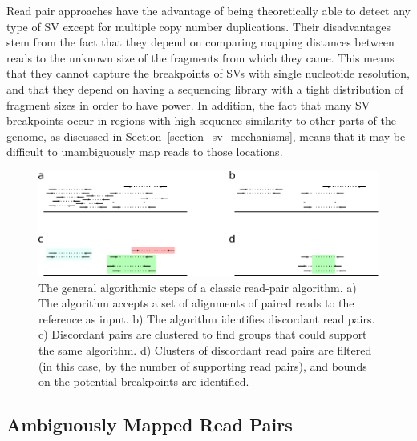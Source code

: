 Read pair approaches have the advantage of being theoretically able to detect any type of SV except for multiple copy number duplications. Their disadvantages stem from the fact that they depend on comparing mapping distances between reads to the unknown size of the fragments from which they came. This means that they cannot capture the breakpoints of SVs with single nucleotide resolution, and that they depend on having a sequencing library with a tight distribution of fragment sizes in order to have power. In addition, the fact that many SV breakpoints occur in regions with high sequence similarity to other parts of the genome, as discussed in Section~\ref{section_sv_mechanisms}, means that it may be difficult to unambiguously map reads to those locations.

\begin{figure}
\centering
\includegraphics[width=\textwidth]{figures/rp_method_workflow.pdf}
\caption{The general algorithmic steps of a classic read-pair algorithm. a) The algorithm accepts a set of alignments of paired reads to the reference as input. b) The algorithm identifies discordant read pairs. c) Discordant pairs are clustered to find groups that could support the same algorithm. d) Clusters of discordant read pairs are filtered (in this case, by the number of supporting read pairs), and bounds on the potential breakpoints are identified.}
\label{rp_method_workflow}
\end{figure}

\subsection{Ambiguously Mapped Read Pairs}

